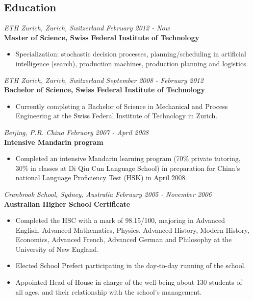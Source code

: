 \documentclass[margin]{res}
\begin{document}
\begin{resume}
\section{Education}
  {\it ETH Zurich, Zurich, Switzerland \hfill February 2012 - Now} \\
  {\bf Master of Science, Swiss Federal Institute of Technology}
  \begin{itemize} \itemsep -0.5pt 
  \item Specialization: stochastic decision processes, planning/scheduling in artificial intelligence (search), production machines, production planning and logistics.
  \end{itemize}
  {\it ETH Zurich, Zurich, Switzerland \hfill September 2008 - February 2012} \\
  {\bf Bachelor of Science, Swiss Federal Institute of Technology}
  \begin{itemize} \itemsep -0.5pt 
  \item Currently completing a Bachelor of Science in Mechanical and Process Engineering at the Swiss Federal Institute of Technology in Zurich.
  \end{itemize}
  {\it Beijing, P.R. China \hfill February 2007 - April 2008} \\
  {\bf Intensive Mandarin program}
  \begin{itemize} \itemsep -0.5pt 
  \item Completed an intensive Mandarin learning program (70\% private tutoring, 30\% in classes at Di Qiu Cun Language School) in preparation for China’s national Language Proficiency Test (HSK) in April 2008.
  \end{itemize}
  {\it Cranbrook School, Sydney, Australia \hfill February 2005 - November 2006} \\
  {\bf Australian Higher School Certificate}
  \begin{itemize} \itemsep -0.5pt 
  \item Completed the HSC with a mark of 98.15/100, majoring in Advanced English, Advanced Mathematics, Physics, Advanced History, Modern History, Economics, Advanced French, Advanced German and Philosophy at the University of New England.
  \item Elected School Prefect participating in the day-to-day running of the school.
  \item Appointed Head of House in charge of the well-being about 130 students of all ages.
and their relationship with the school’s management.

\end{itemize}
\end{resume}
\end{document}
